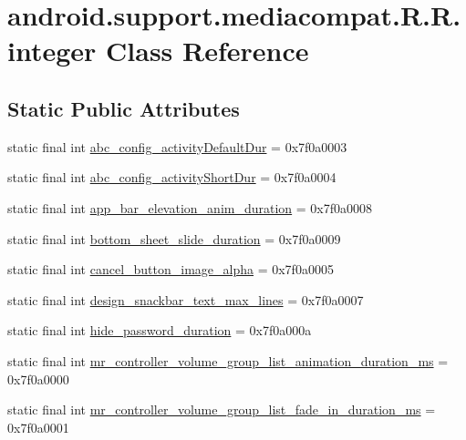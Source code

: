 \hypertarget{classandroid_1_1support_1_1mediacompat_1_1_r_1_1integer}{
\section{android.support.mediacompat.R.R.integer Class Reference}
\label{classandroid_1_1support_1_1mediacompat_1_1_r_1_1integer}
}
\subsection*{Static Public Attributes}
\begin{CompactItemize}
\item 
static final int \hyperlink{classandroid_1_1support_1_1mediacompat_1_1_r_1_1integer_3e55fe2e5e33ca1dac6956e8cc150801}{abc\_\-config\_\-activityDefaultDur} = 0x7f0a0003
\item 
static final int \hyperlink{classandroid_1_1support_1_1mediacompat_1_1_r_1_1integer_695eafdf0a459b8f686380ea69119da9}{abc\_\-config\_\-activityShortDur} = 0x7f0a0004
\item 
static final int \hyperlink{classandroid_1_1support_1_1mediacompat_1_1_r_1_1integer_9a5b3cc3e15fcfe98a28ef6d0820f579}{app\_\-bar\_\-elevation\_\-anim\_\-duration} = 0x7f0a0008
\item 
static final int \hyperlink{classandroid_1_1support_1_1mediacompat_1_1_r_1_1integer_1fd78363081ecd6a568f7a5919a6e315}{bottom\_\-sheet\_\-slide\_\-duration} = 0x7f0a0009
\item 
static final int \hyperlink{classandroid_1_1support_1_1mediacompat_1_1_r_1_1integer_76836403b3a002f2bda507302e63ed71}{cancel\_\-button\_\-image\_\-alpha} = 0x7f0a0005
\item 
static final int \hyperlink{classandroid_1_1support_1_1mediacompat_1_1_r_1_1integer_9bac0986c3b41eef5cd4a2852a0e8c99}{design\_\-snackbar\_\-text\_\-max\_\-lines} = 0x7f0a0007
\item 
static final int \hyperlink{classandroid_1_1support_1_1mediacompat_1_1_r_1_1integer_94d294e49533c07296277c856b2804d4}{hide\_\-password\_\-duration} = 0x7f0a000a
\item 
static final int \hyperlink{classandroid_1_1support_1_1mediacompat_1_1_r_1_1integer_01f29d49ed5d2532046691eb2850852a}{mr\_\-controller\_\-volume\_\-group\_\-list\_\-animation\_\-duration\_\-ms} = 0x7f0a0000
\item 
static final int \hyperlink{classandroid_1_1support_1_1mediacompat_1_1_r_1_1integer_deed8cc1dd794453ffc0111868f9d6cc}{mr\_\-controller\_\-volume\_\-group\_\-list\_\-fade\_\-in\_\-duration\_\-ms} = 0x7f0a0001

\end{CompactItemize}
